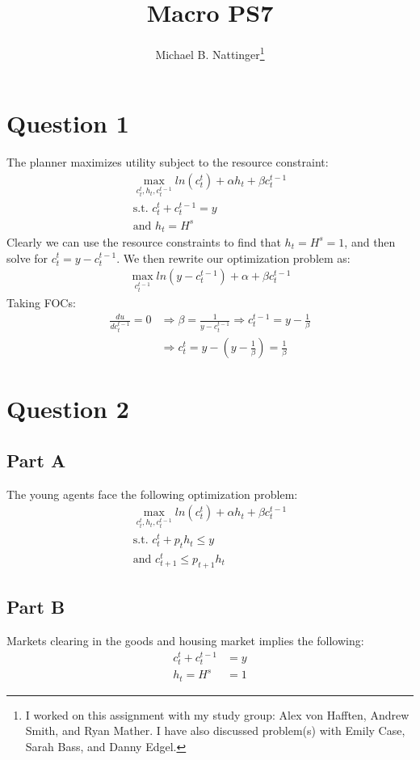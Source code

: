 \documentclass[11pt]{article} %
\title{Macro PS7}
\author{Michael B. Nattinger\footnote{I worked on this assignment with my study group: Alex von Hafften, Andrew Smith, and Ryan Mather. I have also discussed problem(s) with Emily Case, Sarah Bass, and Danny Edgel.}}
\begin{document}
\maketitle

\section{Question 1}
The planner maximizes utility subject to the resource constraint:
\begin{align*}
\max_{c_t^t,h_t,c_{t}^{t-1}} ln(c_t^t) + \alpha h_t + \beta c_{t}^{t-1}\\
\text{s.t. } c_t^t + c_{t}^{t-1} = y\\
\text{and } h_t = H^s
\end{align*}
Clearly we can use the resource constraints to find that $h_t = H^s =1$, and then solve for $c_t^t = y - c_t^{t-1}.$ We then rewrite our optimization problem as:
\begin{align*}
\max_{c_{t}^{t-1}} ln(y - c_t^{t-1}) + \alpha  + \beta c_{t}^{t-1}
\end{align*}
Taking FOCs:
\begin{align*}
\frac{d u}{dc_t^{t-1}} = 0 &\Rightarrow \beta = \frac{1}{y-c_t^{t-1}} \Rightarrow c_{t}^{t-1} = y - \frac{1}{\beta}\\
&\Rightarrow c_t^t = y - (y - \frac{1}{\beta}) =  \frac{1}{\beta}
\end{align*}
\section{Question 2}
\subsection{Part A}
The young agents face the following optimization problem:
\begin{align*}
\max_{c_t^t,h_t,c_{t}^{t-1}} ln(c_t^t) + \alpha h_t + \beta c_{t}^{t-1}\\
\text{s.t. } c_t^t + p_t h_t \leq y\\
\text{and } c_{t+1}^t \leq p_{t+1}h_{t}
\end{align*}

\subsection{Part B}

Markets clearing in the goods and housing market implies the following:
\begin{align*}
c_t^t + c_{t}^{t-1} &= y\\
h_t = H^s &= 1
\end{align*}
\end{document}
